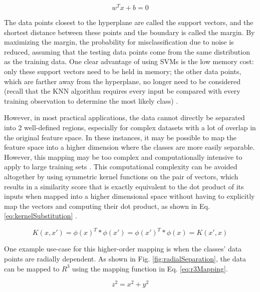 \begin{equation}
\label{eq:hyperplane}
w^{T}x + b = 0
\end{equation}


The data points closest to the hyperplane are called the support vectors, and the shortest distance between these points and the boundary is called the margin.  By maximizing the margin, the probability for misclassification due to noise is reduced, assuming that the testing data points come from the same distribution as the training data.  One clear advantage of using SVMs is the low memory cost: only these support vectors need to be held in memory; the other data points, which are farther away from the hyperplane, no longer need to be considered (recall that the KNN algorithm requires every input be compared with every training observation to determine the most likely class) \cite{svmIR}.  

However, in most practical applications, the data cannot directly be separated into 2 well-defined regions, especially for complex datasets with a lot of overlap in the original feature space.  In these instances, it may be possible to map the feature space into a higher dimension where the classes are more easily separable.  However, this mapping may be too complex and computationally intensive to apply to large training sets \cite{svmTutorial}.  This computational complexity can be avoided altogether by using symmetric kernel functions on the pair of vectors, which results in a similarity score that is exactly equivalent to the dot product of its inputs when mapped into a higher dimensional space without having to explicitly map the vectors and computing their dot product, as shown in Eq. \ref{eq:kernelSubstitution} \cite{bishop}.


\begin{equation}
\label{eq:kernelSubstitution}
K(x, x') = \phi(x)^{T}*\phi(x') = \phi(x')^{T}*\phi(x) = K(x', x)
\end{equation}


One example use-case for this higher-order mapping is when the classes' data points are radially dependent.  As shown in Fig. \ref{fig:radialSeparation}, the data can be mapped to $R^{3}$ using the mapping function in Eq. \ref{eq:r3Mapping}.


\begin{equation}
\label{eq:r3Mapping}
z^{2} = x^{2} + y^{2}
\end{equation}


